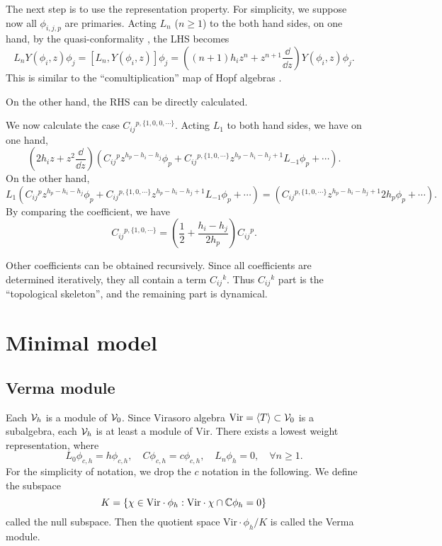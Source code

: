 \documentclass{article}
\begin{document}
The next step is to use the representation property. For simplicity, we suppose now all $\phi_{i,j,p}$ are primaries. Acting $L_n$ ($n\geq 1$) to the both hand sides, on one hand, by the quasi-conformality \cite{vertex_operator_algebra:Wikipedia}, the LHS becomes
\[
L_nY(\phi_i, z)\phi_j = [L_n, Y(\phi_i, z)]\phi_j = \left((n+1)h_iz^n + z^{n+1}\frac{\dd}{\dd z}\right)Y(\phi_i, z)\phi_j.
\]
This is similar to the ``comultiplication'' map of Hopf algebras \cite{Moore:1988qv}.

On the other hand, the RHS can be directly calculated.

We now calculate the case $C_{ij}{}^{p,\{1,0,0,\cdots\}}$. Acting $L_1$ to both hand sides, we have on one hand, 
\[
\left(2h_i z + z^2\frac{\dd}{\dd z}\right)\left(C_{ij}{}^p z^{h_p-h_i-h_j}\phi_p+C_{ij}{}^{p,\{1,0,\cdots\}}z^{h_p-h_i-h_j+1}L_{-1}\phi_p + \cdots\right).
\]
On the other hand,
\[
L_1\left(C_{ij}{}^p z^{h_p-h_i-h_j}\phi_p+C_{ij}{}^{p,\{1,0,\cdots\}}z^{h_p-h_i-h_j+1}L_{-1}\phi_p + \cdots\right) = \left(C_{ij}{}^{p,\{1,0,\cdots\}}z^{h_p-h_i-h_j+1}2h_p\phi_p + \cdots\right).
\]
By comparing the coefficient, we have
\[
C_{ij}{}^{p,\{1,0,\cdots\}} = \left(\frac{1}{2} + \frac{h_i-h_j}{2h_p}\right) C_{ij}{}^{p}.
\]

Other coefficients can be obtained recursively. Since all coefficients are determined iteratively, they all contain a term $C_{ij}{}^k$. Thus $C_{ij}{}^k$ part is the ``topological skeleton'', and the remaining part is dynamical.

\section{Minimal model}
\subsection{Verma module}
Each ${\cal V}_h$ is a module of ${\cal V}_0$. Since Virasoro algebra $\mathrm{Vir} = \langle T\rangle\subset {\cal V}_0$ is a subalgebra, each ${\cal V}_h$ is at least a module of $\mathrm{Vir}$. There exists a lowest weight representation, where
\[
L_0\phi_{c,h} = h\phi_{c,h},\quad C\phi_{c,h} = c\phi_{c,h},\quad L_{n}\phi_h = 0,\quad \forall n\geq 1.
\]
For the simplicity of notation, we drop the $c$ notation in the following.
We define the subspace
\[
K = \left\{\chi\in  \mathrm{Vir}\cdot \phi_h: \mathrm{Vir}\cdot \chi\cap \mathbb{C}\phi_h = 0\right\}
\]
called the null subspace. Then the quotient space $\mathrm{Vir}\cdot \phi_h/K$ is called the Verma module.
\end{document}
